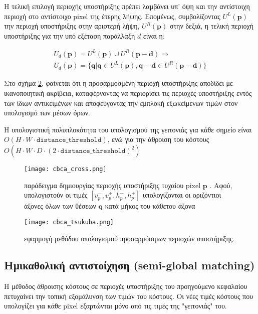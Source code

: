 Η τελική επιλογή περιοχής υποστήριξης πρέπει λαμβάνει υπ' όψη και την αντίστοιχη περιοχή στο αντίστοιχο \e pixel \g της έτερης λήψης. Επομένως, συμβολίζοντας \e $U^{L}(\mathbf{p})$ \g την περιοχή υποστήριξης στην αριστερή λήψη, \e $U^{R}(\mathbf{p})$ \g στην δεξιά, η τελική περιοχή υποστήριξης για την υπό εξέταση παράλλαξη $d$ είναι η: \e

\begin{gather*}
U_d(\mathbf{p}) = U^{L}(\mathbf{p}) \cup  U^{R}(\mathbf{p-d}) \Rightarrow\\
U_d(\mathbf{p}) = \{\mathbf{q} | \mathbf{q} \in U^L(\mathbf{p}), \mathbf{q}-\mathbf{d}
\in U^R(\mathbf{p}-\mathbf{d})\}
\end{gather*}\g

Στο σχήμα \ref{fig:cbca_tsukuba}, φαίνεται ότι η προσαρμοσμένη περιοχή υποστήριξης αποδίδει με ικανοποιητική ακρίβεια, καταφέρνοντας να περιορίσει τις περιοχές υποστήριξης εντός των ίδιων αντικειμένων και αποφεύγοντας την εμπλοκή εξωκείμενων τιμών στον υπολογισμό των μέσων όρων. 

Η υπολογιστική πολυπλοκότητα του υπολογισμού της γειτονιάς για κάθε σημείο είναι \e $O(H \cdot W \cdot \texttt{distance\_threshold})$, \g ενώ για την άθροιση του κόστους $O(H \cdot W \cdot D \cdot (2 \cdot \texttt{distance\_threshold})^2)$ 

\begin{figure}
	\centering
	\texttt{[image: cbca\_cross.png]}
	\caption{παράδειγμα δημιουργίας περιοχής υποστήριξης τυχαίου \e pixel $\mathbf{p}$ \g. Αφού, υπολογιστούν οι τιμές $[v_{p}^-, v_{p}^+, h_{p}^-, h_{p}^+]$ υπολογίζονται οι οριζόντιοι άξονες όλων των θέσεων \e $\mathbf{q}$ \g κατά μήκος του κάθετου άξονα}
	\label{fig:cbca_cross}
\end{figure}

\begin{figure}
	\centering
	\texttt{[image: cbca\_tsukuba.png]}
	\caption{εφαρμογή μεθόδου υπολογισμού προσαρμόσιμων περιοχών υποστήριξης.}
	\label{fig:cbca_tsukuba}
\end{figure}

\subsection{Ημικαθολική αντιστοίχηση \texorpdfstring{\e (semi-global matching) \g}{TEXT}}

Η μέθοδος άθροισης κόστους σε περιοχές υποστήριξης του προηγούμενο κεφαλαίου πετυχαίνει την τοπική εξομάλυνση των τιμών του κόστους. Οι νέες τιμές κόστους που υπολογίζει για κάθε \e pixel \g εξαρτώνται μόνο από τις τιμές της "γειτονιάς" του.

